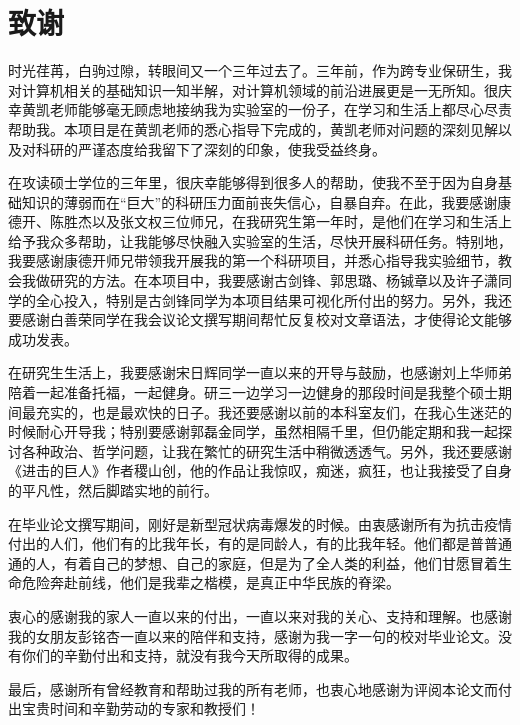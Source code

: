 
\chapter*{致\quad 谢}

时光荏苒，白驹过隙，转眼间又一个三年过去了。三年前，作为跨专业保研生，我对计算机相关的基础知识一知半解，对计算机领域的前沿进展更是一无所知。很庆幸黄凯老师能够毫无顾虑地接纳我为实验室的一份子，在学习和生活上都尽心尽责帮助我。本项目是在黄凯老师的悉心指导下完成的，黄凯老师对问题的深刻见解以及对科研的严谨态度给我留下了深刻的印象，使我受益终身。

在攻读硕士学位的三年里，很庆幸能够得到很多人的帮助，使我不至于因为自身基础知识的薄弱而在“巨大”的科研压力面前丧失信心，自暴自弃。在此，我要感谢康德开、陈胜杰以及张文权三位师兄，在我研究生第一年时，是他们在学习和生活上给予我众多帮助，让我能够尽快融入实验室的生活，尽快开展科研任务。特别地，我要感谢康德开师兄带领我开展我的第一个科研项目，并悉心指导我实验细节，教会我做研究的方法。在本项目中，我要感谢古剑锋、郭思璐、杨铖章以及许子潇同学的全心投入，特别是古剑锋同学为本项目结果可视化所付出的努力。另外，我还要感谢白善荣同学在我会议论文撰写期间帮忙反复校对文章语法，才使得论文能够成功发表。

在研究生生活上，我要感谢宋日辉同学一直以来的开导与鼓励，也感谢刘上华师弟陪着一起准备托福，一起健身。研三一边学习一边健身的那段时间是我整个硕士期间最充实的，也是最欢快的日子。我还要感谢以前的本科室友们，在我心生迷茫的时候耐心开导我；特别要感谢郭磊金同学，虽然相隔千里，但仍能定期和我一起探讨各种政治、哲学问题，让我在繁忙的研究生活中稍微透透气。另外，我还要感谢《进击的巨人》作者稷山创，他的作品让我惊叹，痴迷，疯狂，也让我接受了自身的平凡性，然后脚踏实地的前行。

在毕业论文撰写期间，刚好是新型冠状病毒爆发的时候。由衷感谢所有为抗击疫情付出的人们，他们有的比我年长，有的是同龄人，有的比我年轻。他们都是普普通通的人，有着自己的梦想、自己的家庭，但是为了全人类的利益，他们甘愿冒着生命危险奔赴前线，他们是我辈之楷模，是真正中华民族的脊梁。

衷心的感谢我的家人一直以来的付出，一直以来对我的关心、支持和理解。也感谢我的女朋友彭铭杏一直以来的陪伴和支持，感谢为我一字一句的校对毕业论文。没有你们的辛勤付出和支持，就没有我今天所取得的成果。

最后，感谢所有曾经教育和帮助过我的所有老师，也衷心地感谢为评阅本论文而付出宝贵时间和辛勤劳动的专家和教授们！

\maketime

